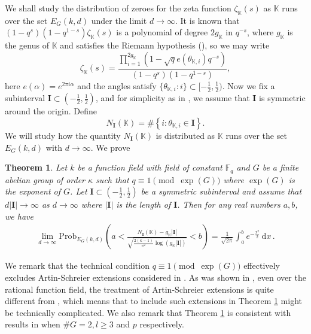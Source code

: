 \documentclass[12pt]{amsart}
\theoremstyle{plain}
\newtheorem{thm}{Theorem}
\begin{document}
We shall study the distribution of zeroes for the zeta function $\zeta_{{\mathbb K}}(s)$ as ${{\mathbb K}}$ runs over the set $E_G(k,d)$ under the limit $d \to \infty$. It is known that $\left(1-q^s\right)\left(1-q^{1-s}\right) \zeta_{{\mathbb K}}(s)$ is a polynomial of degree $2g_{{\mathbb K}}$ in $q^{-s}$, where $g_{{\mathbb K}}$ is the genus of ${{\mathbb K}}$ and satisfies the Riemann hypothesis (\cite{ros}), so we may write
\[\zeta_{{\mathbb K}}(s)=\frac{\prod_{i=1}^{2g_{{\mathbb K}}} \left(1-\sqrt{q} e(\theta_{{{\mathbb K}},i})q^{-s}\right)}{\left(1-q^s\right)\left(1-q^{1-s}\right)}, \]
here $e(\alpha)=e^{2 \pi i \alpha}$ and the angles satisfy $\{\theta_{{{\mathbb K}},i}:i\} \subset [-\frac{1}{2},\frac{1}{2})$. Now we fix a subinterval ${{\mathbf I}} \subset (-\frac{1}{2},\frac{1}{2})$, and for simplicity as in \cite{fai}, we assume that ${{\mathbf I}}$ is symmetric around the origin. Define
\[N_{{\mathbf I}}({{\mathbb K}})=\#\left\{i: \theta_{{{\mathbb K}},i} \in {{\mathbf I}}\right\}. \]
We will study how the quantity $N_{{\mathbf I}}({{\mathbb K}})$ is distributed as ${{\mathbb K}}$ runs over the set $E_G(k,d)$ with $d \to \infty$. We prove \begin{thm} \label{main2} Let $k$ be a function field with field of constant ${{\mathbb F}_q}$ and $G$ be a finite abelian group of order $\kappa$ such that $q \equiv 1 \pmod{\exp(G)}$ where $\exp(G)$ is the exponent of $G$. Let ${{\mathbf I}} \subset \left(-\frac{1}{2},\frac{1}{2}\right)$ be a symmetric subinterval and assume that $d |{{\mathbf I}}| \to \infty$ as $d \to \infty$ where $|{{\mathbf I}}|$ is the length of ${{\mathbf I}}$. Then for any real numbers $a,b$, we have
\begin{eqnarray*} \lim_{d \to \infty} {\mathrm{Prob}}_{E_G(k,d)} \left(a<\frac{N_{{\mathbf I}}({{\mathbb K}})-g_{{\mathbb K}}|{{\mathbf I}}|}{\sqrt{\frac{2(\kappa-1)}{\pi^2} \log (g_{{\mathbb K}} |{{\mathbf I}}|)}}<b \right) =\frac{1}{\sqrt{2 \pi}} \int_{a}^{b} e^{-\frac{x^2}{2}} \, {\mathrm{d}} x \,.\end{eqnarray*}
\end{thm}
We remark that the technical condition $q \equiv 1 \pmod{\exp (G)}$ effectively excludes Artin-Schreier extensions considered in \cite{buc3}. As was shown in \cite{buc3}, even over the rational function field, the treatment of Artin-Schreier extensions is quite different from \cite{fai,xio}, which means that to include such extensions in Theorem \ref{main2} might be technically complicated. We also remark that Theorem \ref{main2} is consistent with results in \cite{fai,xio,buc3} when $\# G=2,l \ge 3$ and $p$ respectively.
\end{document}
